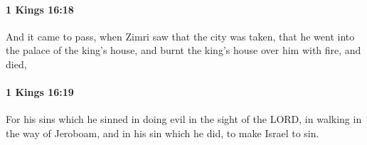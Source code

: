 		\paragraph{1 Kings 16:18} %
			\label{1KINGS-16-18}

			And it came to pass, when Zimri saw that the city was taken, that he went into the palace of the king’s house, and burnt the king’s house over him with fire, and died,


		\paragraph{1 Kings 16:19} %
			\label{1KINGS-16-19}

			For his sins which he sinned in doing evil in the sight of the LORD, in walking in the way of Jeroboam, and in his sin which he did, to make Israel to sin.


